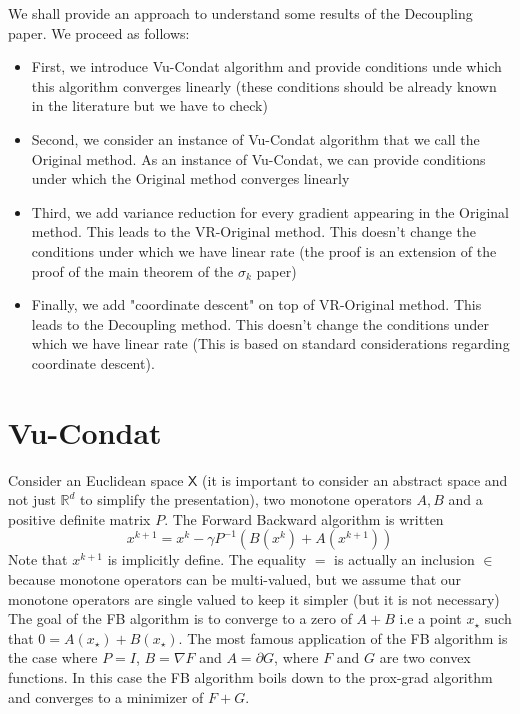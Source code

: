 \documentclass{article}
\newcommand{\bR}{{\mathbb R}}
\newcommand{\sX}{{\mathsf X}}
\theoremstyle{definition}
\begin{document}
We shall provide an approach to understand some results of the Decoupling paper. We proceed as follows:
\begin{itemize}
    \item First, we introduce Vu-Condat algorithm and provide conditions unde which this algorithm converges linearly (these conditions should be already known in the literature but we have to check)
    \item Second, we consider an instance of Vu-Condat algorithm that we call the Original method. As an instance of Vu-Condat, we can provide conditions under which the Original method converges linearly
    \item Third, we add variance reduction for every gradient appearing in the Original method. This leads to the VR-Original method. This doesn't change the conditions under which we have linear rate (the proof is an extension of the proof of the main theorem of the $\sigma_k$ paper)
    \item Finally, we add "coordinate descent" on top of VR-Original method. This leads to the Decoupling method. This doesn't change the conditions under which we have linear rate (This is based on standard considerations regarding coordinate descent).
\end{itemize}

\section{Vu-Condat}

Consider an Euclidean space $\sX$ (it is important to consider an abstract space and not just $\bR^d$ to simplify the presentation), two monotone operators $A,B$ and a positive definite matrix $P$.
The Forward Backward algorithm is written
\begin{equation}
    \label{eq:FB}
    x^{k+1} = x^k - \gamma P^{-1} (B(x^k) + A(x^{k+1}))
\end{equation}
Note that $x^{k+1}$ is implicitly define. The equality $=$ is actually an inclusion $\in$ because monotone operators can be multi-valued, but we assume that our monotone operators are single valued to keep it simpler (but it is not necessary)
The goal of the FB algorithm is to converge to a zero of $A+B$ i.e a point $x_\star$ such that $0 = A(x_\star) + B(x_\star)$. The most famous application of the FB algorithm is the case where $P=I$, $B = \nabla F$ and $A = \partial G$, where $F$ and $G$ are two convex functions. In this case the FB algorithm boils down to the prox-grad algorithm and converges to a minimizer of $F+G$.
\end{document}
